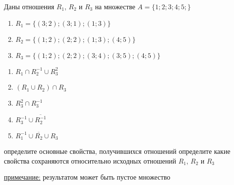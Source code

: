 \question
Даны отношения $R_1$, $R_2$ и $R_3$ на множестве $A = \{1; 2; 3; 4; 5;\}$ 
\begin{enumerate}
	\renewcommand{\labelenumi}{\alph{enumi})}
	\item $R_1 = \{(3; 2); (3; 1); (1; 3)\}$
	\item $R_2 = \{(1; 2); (2; 2); (1; 3); (4; 5)\}$
	\item $R_3 = \{(1; 2); (2; 2); (3; 4); (3; 5); (4; 5)\}$
\end{enumerate}

\begin{enumerate}
	\renewcommand{\labelenumi}{\alph{enumi})}
	\item $R_1 \cap R_2^{-1} \cup R_3^2$
	\item $(R_1 \cup R_2) \cap R_3$
	\item $R_3^2 \cap R_3^{-1}$
	\item $R_3^{-1} \cup \overline{R_2^{-1}}$
	\item $R_1^{-1} \cup \overline{R_2} \cup R_3$
\end{enumerate}

определите основные свойства, получившихся отношений
определите какие свойства сохраняются относительно исходных отношений $R_1$, $R_2$ и $R_3$ 

\underline{примечание:} результатом может быть пустое множество